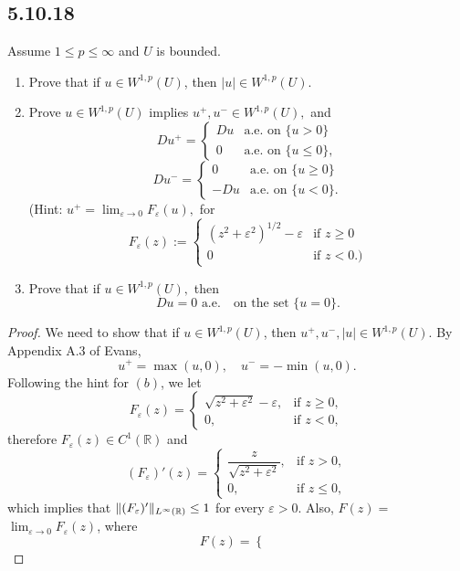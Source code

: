 \documentclass{article}
\DeclarePairedDelimiter{\norm}{\lVert}{\rVert}
\begin{document}
\begin{flushleft}
\subsection{\textbf{5.10.18}} Assume $1\le p\le \infty$ and $U$ is bounded.
\begin{enumerate}[label=(\alph*)]
    \item Prove that if $u\in W^{1,p}(U)$, then $|u|\in W^{1,p}(U)$.
    \item Prove $u\in W^{1,p}(U)$ implies $u^+,u^-\in W^{1,p}(U),$ and
    $$Du^+=\begin{cases} 
      Du & \text{a.e. on $\{u > 0\}$} \\
      0 & \text{a.e. on $\{u\le 0\}$},
   \end{cases}$$
   $$Du^-=\begin{cases} 
      0 & \text{a.e. on $\{u \ge 0\}$} \\
      -Du & \text{a.e. on $\{u < 0\}$}.
   \end{cases}$$
   (Hint: $u^+ = \lim_{\varepsilon\to 0}F_{\varepsilon}(u),$ for
   $$F_{\varepsilon}(z):=\begin{cases} 
      (z^2+\varepsilon^2)^{1/2}-\varepsilon& \text{if $z\ge 0$} \\
      0 & \text{if $z<0$}.)
   \end{cases}$$
   \item Prove that if $u\in W^{1,p}(U),$ then
   $$Du = 0 \text{ a.e.}\quad \text{on the set $\{u=0\}$}.$$
\end{enumerate}
\begin{proof}
We need to show that if $u\in W^{1,p}(U)$, then $u^+, u^-,|u|\in W^{1,p}(U)$. By Appendix A.3 of Evans,
$$u^+=\max(u,0),\quad u^-=-\min(u,0).$$
Following the hint for $(b)$, we let 
$$F_{\varepsilon}(z)=\begin{cases} 
      \sqrt{z^2+\varepsilon^2}-\varepsilon,& \text{if $z\ge 0$}, \\
      0, & \text{if $z<0$,}
   \end{cases}$$
therefore $F_{\varepsilon}(z)\in C^1(\mathbb R)$ and
$$(F_{\varepsilon})'(z)=\begin{cases} 
      \dfrac{z}{\sqrt{z^2+\varepsilon^2}},& \text{if $z > 0$}, \\
      0, & \text{if $z\le 0$},\end{cases}$$
 which implies that $\norm{(F_{\varepsilon})'}_{L^{\infty}(\mathbb R)}\le 1$ for every $\varepsilon > 0$. Also, $F(z)=$ $\lim_{\varepsilon\to 0}F_{\varepsilon}(z)$, where
 $$F(z)=\begin{cases} 

\end{cases}$$
\end{proof}
\end{flushleft}
\end{document}
